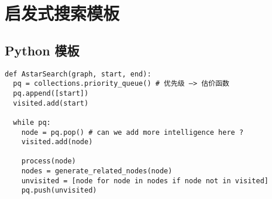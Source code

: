 \newpage
\section{启发式搜索模板}

\subsection{Python 模板}

\begin{verbatim}
def AstarSearch(graph, start, end):
  pq = collections.priority_queue() # 优先级 —> 估价函数
  pq.append([start])
  visited.add(start)

  while pq:
    node = pq.pop() # can we add more intelligence here ?
    visited.add(node)

    process(node)
    nodes = generate_related_nodes(node)
    unvisited = [node for node in nodes if node not in visited]
    pq.push(unvisited)
\end{verbatim}
